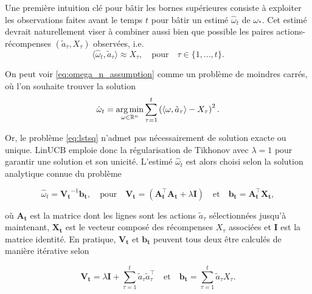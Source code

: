 Une première intuition clé pour bâtir les bornes supérieures consiste à exploiter 
les observations faites avant le temps $t$ pour bâtir un estimé $\hat{\omega}_t$ de 
$\omega_*$.
Cet estimé devrait naturellement viser 
à combiner aussi bien que possible les paires actions-récompenses $(\tilde{a}_\tau, X_\tau)$
observées, i.e.
\begin{equation}
    \langle \hat{\omega}_t, \tilde{a}_\tau\rangle \approx X_\tau, \quad \text{pour} \quad \tau \in \{1, ..., t\}.
    \label{eq:omega_n_assumption}
\end{equation}

On peut voir \eqref{eq:omega_n_assumption} comme un problème 
de moindres carrés, où l'on souhaite trouver la solution
\begin{equation}
    \hat{\omega}_t = \operatorname*{arg\,min}_{\omega \in \mathbb{R}^n} \sum_{\tau=1}^{t} \left( \langle \omega, \tilde{a}_\tau \rangle - X_\tau \right)^2.
    \label{eq:lstsq}
\end{equation}

Or, le problème \eqref{eq:lstsq} n'admet pas nécessairement de solution exacte ou unique.
LinUCB emploie donc la régularisation de Tikhonov \citep{tikhonov1963solution} 
avec $\lambda=1$ pour garantir une solution et son unicité.
L'estimé $\hat{\omega}_t$ est alors choisi selon la solution analytique connue du
problème

\begin{equation}
    \hat{\omega}_t = \mathbf{V_t}^{-1}\mathbf{b_t}, \quad \text{pour} \quad \mathbf{V_t} = (\mathbf{A^\top_t} \mathbf{A_t} + \lambda \mathbf{I}) \quad \text{et} \quad \mathbf{b_t}=\mathbf{A_t^\top} \mathbf{X_t},
    \label{eq:omega_t}
\end{equation}

où $\mathbf{A_t}$ est la matrice dont les lignes sont les actions $\tilde{a}_\tau$ sélectionnées jusqu'à maintenant,
$\mathbf{X_t}$ est le vecteur composé des récompenses $X_\tau$ associées et $\mathbf{I}$ est la matrice identité.
En pratique, $\mathbf{V_t}$ et $\mathbf{b_t}$ peuvent tous deux être calculés de manière 
itérative selon 

\begin{equation}
\mathbf{V_t} = \lambda \mathbf{I} + \displaystyle \sum_{\tau=1}^{t} \tilde{a}_\tau \tilde{a}_\tau^\top \quad \text{et} \quad \mathbf{b_t} = \displaystyle \sum_{\tau=1}^{t} \tilde{a}_\tau X_\tau.
\label{eq:linucb_iteratif}
\end{equation}

